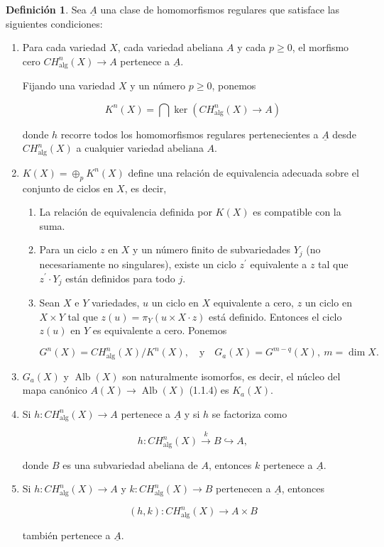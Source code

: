 \documentclass[10pt]{amsart}
\theoremstyle{definition}
\newtheorem{definition}{Definici\'on}[section]
\theoremstyle{remark}
\theoremstyle{definition}
\begin{document}
\begin{definition}\label{Cond}
Sea $\underline{A}$ una clase de homomorfismos regulares que satisface las siguientes condiciones:
\begin{enumerate}\label{Cond}
\item\label{Cond1} Para cada variedad $X$, cada variedad abeliana $A$ y cada $p\geq 0$, el morfismo cero $CH_{\mathrm{alg}}^{n}(X)\to A$ pertenece a $\underline{A}$.

Fijando una variedad $X$ y un número $p\geq 0$, ponemos

\[
K^{n}(X) = \bigcap \ker(CH_{\mathrm{alg}}^{n}(X)\to A)
\]

donde $h$ recorre todos los homomorfismos regulares pertenecientes a $\underline{A}$ desde $CH_{\mathrm{alg}}^{n}(X)$ a cualquier variedad abeliana $A$.

\item\label{Cond2} $K(X) = \oplus_{p}K^{n}(X)$ define una relación de equivalencia adecuada sobre el conjunto de ciclos en $X$, es decir,
\begin{enumerate}

\item La relación de equivalencia definida por $K(X)$ es compatible con la suma.

\item Para un ciclo $z$ en $X$ y un número finito de subvariedades $Y_{j}$ (no necesariamente no singulares), existe un ciclo $z^{\prime}$ equivalente a $z$ tal que $z^{\prime}\cdot Y_{j}$ están definidos para todo $j$.

\item Sean $X$ e $Y$ variedades, $u$ un ciclo en $X$ equivalente a cero, $z$ un ciclo en $X\times Y$ tal que $z(u) = \pi_{Y}(u\times X\cdot z)$ está definido. Entonces el ciclo $z(u)$ en $Y$ es equivalente a cero. Ponemos

\[
G^{n}(X) = CH_{\mathrm{alg}}^{n}(X) / K^{n}(X),\quad\text{y}\quad G_{a}(X) = G^{m - q}(X),\ m = \dim X.
\]
\end{enumerate}

\item\label{Cond3} $G_{a}(X)$ y $\operatorname{Alb}(X)$ son naturalmente isomorfos, es decir, el núcleo del mapa canónico $A(X)\to \operatorname{Alb}(X)$ (1.1.4) es $K_{a}(X)$.

\item\label{Cond4} Si $h:CH_{\mathrm{alg}}^{n}(X)\to A$ pertenece a $\underline{A}$ y si $h$ se factoriza como

\[
h:CH_{\mathrm{alg}}^{n}(X)\xrightarrow{k}B\hookrightarrow A,
\]

donde $B$ es una subvariedad abeliana de $A$, entonces $k$ pertenece a $\underline{A}$.

\item\label{Cond5} Si $h:CH_{\mathrm{alg}}^{n}(X)\to A$ y $k:CH_{\mathrm{alg}}^{n}(X)\to B$ pertenecen a $\underline{A}$, entonces


\[
(h,k):CH_{\mathrm{alg}}^{n}(X)\to A\times B
\]

también pertenece a $\underline{A}$.
\end{enumerate}
\end{definition}
\end{document}
